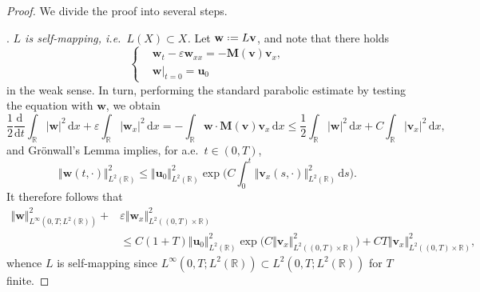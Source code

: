 \documentclass[10pt,a4paper]{amsart}
\newcommand*{\defeq}{\mathrel{\vcenter{\baselineskip0.5ex \lineskiplimit0pt
                     \hbox{\scriptsize.}\hbox{\scriptsize.}}}%
                     =}
\newcommand{\bM}{\mathbf{M}}
\newcommand{\bu}{\mathbf{u}}
\newcommand{\bv}{\mathbf{v}}
\newcommand{\bw}{\mathbf{w}}
\newcommand{\der}{\mathrm{d}}
\renewcommand{\d}{\, \mathrm{d}}
\renewcommand{\leq}{\leqslant}
\begin{document}
\begin{proof}
We divide the proof into several steps. 

\smallskip 


 . \textit{$L$ is self-mapping, i.e.~$L(X) \subset X$.}  Let $\bw \defeq L\bv$, and note that there holds 
\begin{equation*}
    \left\lbrace\begin{aligned}
    &\bw_t - \varepsilon\bw_{xx} = - \bM(\bv)\bv_x, \\ 
    &\bw|_{t=0} = \bu_0 
    \end{aligned}\right. 
\end{equation*}
in the weak sense. In turn, performing the standard parabolic estimate by testing the equation with $\bw$, we obtain 
\begin{equation*}
    \frac{1}{2}\frac{\der}{\der t}\int_\mathbb{R} |\bw|^2 \d x + \varepsilon \int_\mathbb{R} |\bw_x|^2 \d x = -\int_{\mathbb{R}} \bw \cdot \bM(\bv)\bv_x \d x \leq \frac{1}{2}\int_\mathbb{R} |\bw|^2 \d x + C\int_\mathbb{R}|\bv_x|^2 \d x, 
\end{equation*}
and Gr\"onwall's Lemma implies, for a.e.~$t \in (0,T)$, 
\begin{equation*}
    \Vert \bw (t,\cdot) \Vert^2_{L^2(\mathbb{R})} \leq \Vert \bu_0 \Vert^2_{L^2(\mathbb{R})} \exp\Big( C \int_0^t \Vert \bv_x(s,\cdot) \Vert^2_{L^2(\mathbb{R})} \d s \Big). 
\end{equation*}
It therefore follows that 
\begin{equation}\label{eq:L2H1 est fixed point}
    \begin{aligned} \Vert \bw \Vert^2_{L^\infty(0,T;L^2(\mathbb{R}))} + & \varepsilon \Vert \bw_x \Vert^2_{L^2((0,T)\times\mathbb{R})} \\ 
    &\leq C(1+T)\Vert \bu_0 \Vert^2_{L^2(\mathbb{R})} \exp\Big( C \Vert \bv_x \Vert^2_{L^2((0,T)\times\mathbb{R})}  \Big) + CT \Vert \bv_x \Vert^2_{L^2((0,T)\times\mathbb{R})}, 
    \end{aligned}
\end{equation}
whence $L$ is self-mapping since $L^\infty(0,T;L^2(\mathbb{R})) \subset L^2(0,T;L^2(\mathbb{R}))$ for $T$ finite. 



\end{proof}
\end{document}
